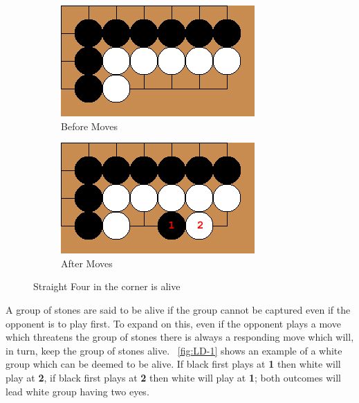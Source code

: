 \documentclass{l4proj}
\newcommand{\bo}[1]{\textbf{#1}}
\begin{document}
\begin{figure}[!ht]
\centering
\begin{subfigure}[b]{0.45\textwidth}
\includegraphics[width=\textwidth]{LD/1a.png}
\caption{Before Moves}
\label{fig:LD-1a}
\end{subfigure}\qquad
\begin{subfigure}[b]{0.45\textwidth}
\includegraphics[width=\textwidth]{LD/1b.png}
\caption{After Moves}
\label{fig:LD-1b}
\end{subfigure}
\caption{Straight Four in the corner is alive}
\label{fig:LD-1}
\end{figure}

A group of stones are said to be alive if the group cannot be captured even if the opponent is to play first. To expand on this, even if the opponent plays a move which threatens the group of stones there is always a responding move which will, in turn, keep the group of stones alive. ~\autoref{fig:LD-1} shows an example of a white group which can be deemed to be alive. If black first plays at \bo{1} then white will play at \bo{2}, if black first plays at \bo{2} then white will play at \bo{1}; both outcomes will lead white group having two eyes.
\end{document}
